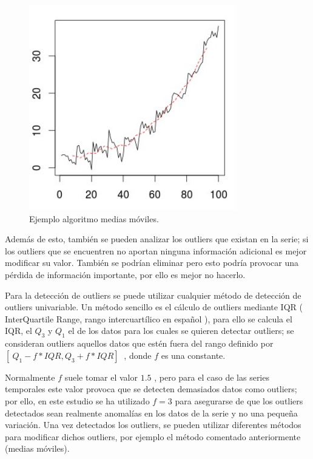 \begin{figure}[h]
	\centering
	\includegraphics[width=90mm]{imagenes/moving_averages.png}
	\caption{Ejemplo algoritmo medias móviles.}
	\label{fig:51}
\end{figure}

Además de esto, también se pueden analizar los outliers que existan en la serie; si los outliers que se encuentren no aportan ninguna información adicional es mejor modificar su valor. También se podrían eliminar pero esto podría provocar una pérdida de información importante, por ello es mejor no hacerlo.\newline

Para la detección de outliers se puede utilizar cualquier método de detección de outliers univariable. Un método sencillo es el cálculo de outliers mediante IQR ( InterQuartile Range, rango intercuartílico en español ), para ello se calcula el IQR, el $Q_3$ y $Q_1$ el  de los datos para los cuales se quieren detectar outliers; se consideran outliers aquellos datos que estén fuera del rango definido por $[\ Q_1 - f*IQR, Q_3+f*IQR ]\ $ , donde $f$ es una constante.\newline

Normalmente $f$ suele tomar el valor $1.5$ , pero para el caso de las series temporales este valor provoca que se detecten demasiados datos como outliers; por ello, en este estudio se ha utilizado $f=3$ para asegurarse de que los outliers detectados sean realmente anomalías en los datos de la serie y no una pequeña variación. Una vez detectados los outliers, se pueden utilizar diferentes métodos para modificar dichos outliers, por ejemplo el método comentado anteriormente (medias móviles).\newline

